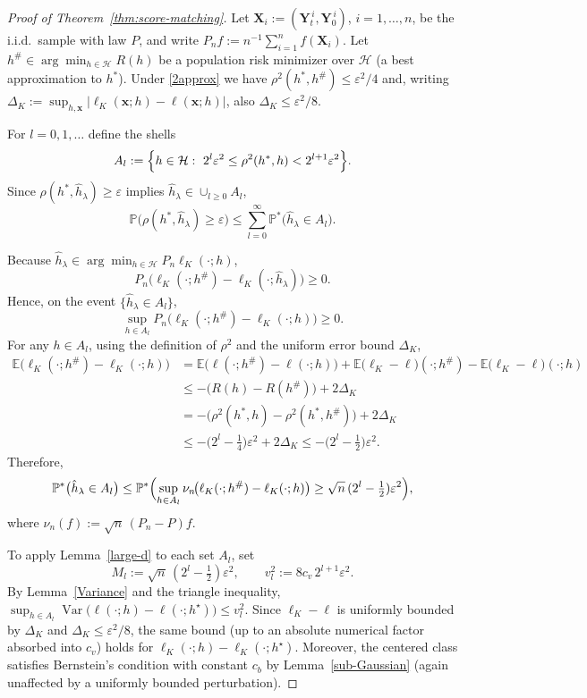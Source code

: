 \documentclass[12pt]{article}
\theoremstyle{definition} %
\newcommand{\Var}{\operatorname{Var}}
\renewcommand{\P}{\ensuremath{\mathbb{P}}} %
\newcommand{\X}{\bm X}
\newcommand{\Y}{\bm Y}
\newcommand{\x}{\bm x}
\providecommand{\E}{\mathbb{E}}
\begin{document}
\begin{proof}[Proof of Theorem~\ref{thm:score-matching}]
Let $\X_i:=(\Y_t^{\,i},\Y_0^{\,i})$, $i=1,\ldots,n$, be the i.i.d.\ sample with law $P$, and write
$P_n f:=n^{-1}\sum_{i=1}^n f(\X_i)$.
Let $h^{\#}\in\arg\min_{h\in\mathcal H}R(h)$ be a population risk minimizer over $\mathcal H$ (a best approximation to $h^*$).
Under \eqref{2approx} we have $\rho^2(h^*,h^{\#})\le\varepsilon^2/4$ and, writing
$\Delta_K:=\sup_{h,\x}\big|\ell_K(\x;h)-\ell(\x;h)\big|$, also $\Delta_K\le\varepsilon^2/8$.

For $l=0,1,\ldots$ define the shells
\[
A_l:=\Bigl\{h\in\mathcal H:\ 2^l\varepsilon^2\le\rho^2(h^*,h)<2^{l+1}\varepsilon^2\Bigr\}.
\]
Since $\rho(h^*,\hat h_{\lambda})\ge\varepsilon$ implies $\hat h_{\lambda}\in\cup_{l\ge0}A_l$,
\[
\P\bigl(\rho(h^*,\hat h_{\lambda})\ge\varepsilon\bigr)
\le\sum_{l=0}^\infty \P^{*}\bigl(\hat h_{\lambda}\in A_l\bigr).
\]

Because $\hat h_{\lambda}\in\arg\min_{h\in\mathcal H}P_n\ell_K(\cdot;h)$,
\[
P_n\bigl(\ell_K(\cdot;h^{\#})-\ell_K(\cdot;\hat h_{\lambda})\bigr)\ge0.
\]
Hence, on the event $\{\hat h_{\lambda}\in A_l\}$,
\[
\sup_{h\in A_l} P_n\bigl(\ell_K(\cdot;h^{\#})-\ell_K(\cdot;h)\bigr)\ge0.
\]
For any $h\in A_l$, using the definition of $\rho^2$ and the uniform error bound $\Delta_K$,
\begin{align*}
\E\bigl(\ell_K(\cdot;h^{\#})-\ell_K(\cdot;h)\bigr)
&=\E\bigl(\ell(\cdot;h^{\#})-\ell(\cdot;h)\bigr)
+\E\bigl(\ell_K-\ell\bigr)(\cdot;h^{\#})
-\E\bigl(\ell_K-\ell\bigr)(\cdot;h)\\
&\le -\bigl(R(h)-R(h^{\#})\bigr)+2\Delta_K\\
&=-\bigl(\rho^2(h^*,h)-\rho^2(h^*,h^{\#})\bigr)+2\Delta_K\\
&\le -\bigl(2^l-\tfrac14\bigr)\varepsilon^2+2\Delta_K
\le -\bigl(2^l-\tfrac12\bigr)\varepsilon^2.
\end{align*}
Therefore,
\[
\P^{*}\bigl(\hat h_{\lambda}\in A_l\bigr)
\le
\P^{*}\Bigl(
\sup_{h\in A_l}\nu_n\!\bigl(\ell_K(\cdot;h^{\#})-\ell_K(\cdot;h)\bigr)
\ge \sqrt n\,(2^l-\tfrac12)\varepsilon^2
\Bigr),
\]
where $\nu_n(f):=\sqrt n\,(P_n-P)f$.

To apply Lemma~\ref{large-d} to each set $A_l$, set
\[
M_l:=\sqrt n\,(2^l-\tfrac12)\varepsilon^2,
\qquad
v_l^2:=8c_v\,2^{l+1}\varepsilon^2.
\]
By Lemma~\ref{Variance} and the triangle inequality,
$\sup_{h\in A_l}\Var\bigl(\ell(\cdot;h)-\ell(\cdot;h^\star)\bigr)\le v_l^2$.
Since $\ell_K-\ell$ is uniformly bounded by $\Delta_K$ and $\Delta_K\le\varepsilon^2/8$, the same bound (up to an absolute numerical factor absorbed into $c_v$) holds for $\ell_K(\cdot;h)-\ell_K(\cdot;h^\star)$.
Moreover, the centered class satisfies Bernstein's condition with constant $c_b$ by Lemma~\ref{sub-Gaussian} (again unaffected by a uniformly bounded perturbation).


\end{proof}
\end{document}
